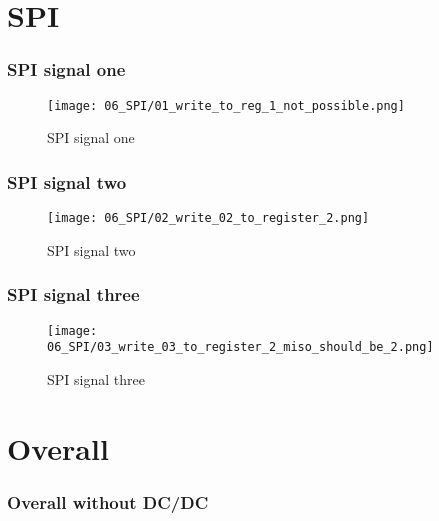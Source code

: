 \documentclass[xcolor=dvipsnames,envcountsect]{beamer}
\begin{document}
\section{SPI}
\begin{frame}
	\frametitle{SPI signal one}
	\begin{figure}[ht]
		\centering
		\texttt{[image: 06\_SPI/01\_write\_to\_reg\_1\_not\_possible.png]}
		\caption{SPI signal one}
	\end{figure}
\end{frame}

\begin{frame}
	\frametitle{SPI signal two}
	\begin{figure}[ht]
		\centering
		\texttt{[image: 06\_SPI/02\_write\_02\_to\_register\_2.png]}
		\caption{SPI signal two}
	\end{figure}
\end{frame}

\begin{frame}
	\frametitle{SPI signal three}
	\begin{figure}[ht]
		\centering
		\texttt{[image: 06\_SPI/03\_write\_03\_to\_register\_2\_miso\_should\_be\_2.png]}
		\caption{SPI signal three}
	\end{figure}
\end{frame}

\section{Overall}
\begin{frame}
	\frametitle{Overall without DC/DC}
	\begin{figure}[ht]
		\centering
	\end{figure}
\end{frame}




















\end{document}
